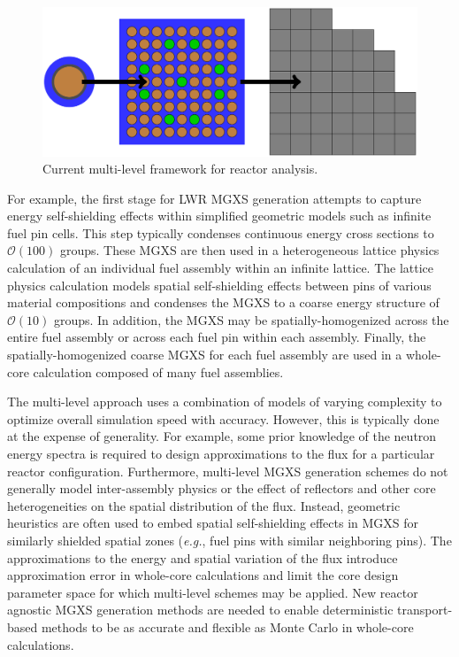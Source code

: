 \begin{figure}
\centering
\includegraphics[width=0.9\linewidth]{figures/intro/multi-step-flow-chart}
\caption[Multi-level approach to reactor analysis]{Current multi-level framework for reactor analysis.}
\label{fig:chap1-multi-level-flow-chart}
\end{figure}

For example, the first stage for \ac{LWR} \ac{MGXS} generation attempts to capture energy self-shielding effects within simplified geometric models such as infinite fuel pin cells. This step typically condenses continuous energy cross sections to $\mathcal{O}(100)$ groups. These \ac{MGXS} are then used in a heterogeneous lattice physics calculation of an individual fuel assembly within an infinite lattice. The lattice physics calculation models spatial self-shielding effects between pins of various material compositions and condenses the \ac{MGXS} to a coarse energy structure of $\mathcal{O}(10)$ groups. In addition, the \ac{MGXS} may be spatially-homogenized across the entire fuel assembly or across each fuel pin within each assembly. Finally, the spatially-homogenized coarse \ac{MGXS} for each fuel assembly are used in a whole-core calculation composed of many fuel assemblies.

The multi-level approach uses a combination of models of varying complexity to optimize overall simulation speed with accuracy. However, this is typically done at the expense of generality. For example, some prior knowledge of the neutron energy spectra is required to design approximations to the flux for a particular reactor configuration. Furthermore, multi-level \ac{MGXS} generation schemes do not generally model inter-assembly physics or the effect of reflectors and other core heterogeneities on the spatial distribution of the flux. Instead, geometric heuristics are often used to embed spatial self-shielding effects in \ac{MGXS} for similarly shielded spatial zones (\textit{e.g.}, fuel pins with similar neighboring pins). The approximations to the energy and spatial variation of the flux introduce approximation error in whole-core calculations and limit the core design parameter space for which multi-level schemes may be applied. New reactor agnostic \ac{MGXS} generation methods are needed to enable deterministic transport-based methods to be as accurate and flexible as Monte Carlo in whole-core calculations.

